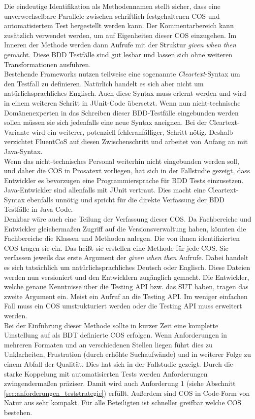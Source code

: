 Die eindeutige Identifikation als Methodennamen stellt sicher, dass eine unverwechselbare Parallele zwischen schriftlich festgehaltenen \Gls{COS} und automatisiertem Test hergestellt werden kann. Der Kommentarbereich kann zusätzlich verwendet werden, um auf Eigenheiten dieser \Gls{COS} einzugehen. Im Inneren der Methode werden dann Aufrufe mit der Struktur \textit{given} \textit{when} \textit{then} gemacht. Diese \Gls{BDD} Testfälle sind gut lesbar und lassen sich ohne weiteren Transformationen ausführen.\\
Bestehende Frameworks nutzen teilweise eine sogenannte \textit{Cleartext}-Syntax um den Testfall zu definieren. Natürlich handelt es sich aber nicht um natürlichsprachliches Englisch. Auch diese Syntax muss erlernt werden und wird in einem weiteren Schritt in JUnit-Code übersetzt. Wenn nun nicht-technische Domänenexperten in das Schreiben dieser BDD-Testfälle eingebunden werden sollen müssen sie sich jedenfalls eine neue Syntax aneignen. Bei der Cleartext-Variante wird ein weiterer, potenziell fehleranfälliger, Schritt nötig. Deshalb verzichtet FluentCoS auf diesen Zwischenschritt und arbeitet von Anfang an mit Java-Syntax.\\
Wenn das nicht-technisches Personal weiterhin nicht eingebunden werden soll, und daher die \Gls{COS} in Prosatext vorliegen, hat sich in der Fallstudie gezeigt, dass Entwickler es bevorzugen eine Programmiersprache für \Gls{BDD} Tests einzusetzen. Java-Entwickler sind allenfalls mit JUnit vertraut. Dies macht eine Cleartext-Syntax ebenfalls unnötig und spricht für die direkte Verfassung der \Gls{BDD} Testfälle in Java Code.\\
Denkbar wäre auch eine Teilung der Verfassung dieser \Gls{COS}. Da Fachbereiche und Entwickler gleichermaßen Zugriff auf die Versionsverwaltung haben, könnten die Fachbereiche die Klassen und Methoden anlegen. Die von ihnen identifizierten \Gls{COS} tragen sie ein. Das heißt sie erstellen eine Methode für jede \Gls{COS}. Sie verfassen jeweils das erste Argument der \textit{given} \textit{when} \textit{then} Aufrufe. Dabei handelt es sich tatsächlich um natürlichsprachliches Deutsch oder Englisch. Diese Dateien werden nun versioniert und den Entwicklern zugänglich gemacht. Die Entwickler, welche genaue Kenntnisse über die Testing API bzw. das \Gls{SUT} haben, tragen das zweite Argument ein. Meist ein Aufruf an die Testing API. Im weniger einfachen Fall muss ein \Gls{COS} umstrukturiert werden oder die Testing API muss erweitert werden.\\
Bei der Einführung dieser Methode sollte in kurzer Zeit eine komplette Umstellung auf als \Gls{BDT} definierte \Gls{COS} erfolgen. Wenn Anforderungen in mehreren Formaten und an verschiedenen Stellen liegen führt dies zu Unklarheiten, Frustration (durch erhöhte Suchaufwände) und in weiterer Folge zu einem Abfall der Qualität. Dies hat sich in der Fallstudie gezeigt. Durch die starke Koppelung mit automatisierten Tests werden Anforderungen zwingendermaßen präziser. Damit wird auch Anforderung 1 (siehe Abschnitt \ref{sec:anforderungen_teststrategie}) erfüllt. Außerdem sind \Gls{COS} in Code-Form von Natur aus sehr kompakt. Für alle Beteiligten ist schneller greifbar welche \Gls{COS} bestehen.\\

